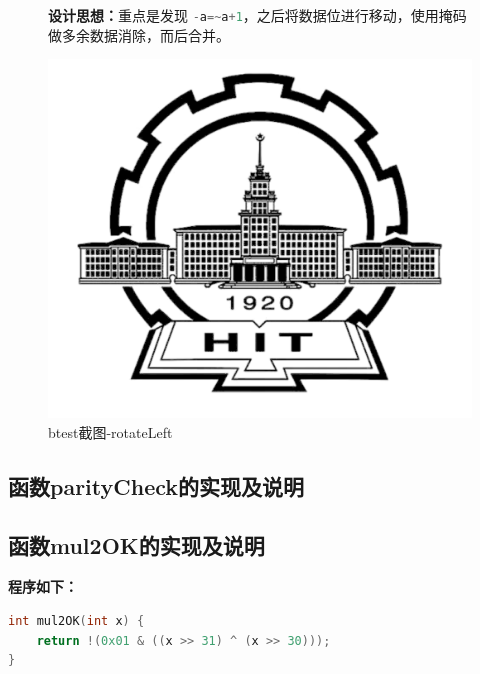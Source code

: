 \begin{figure}[H]
\begin{minipage}[c]{0.5\linewidth}
\textbf{设计思想：}重点是发现 \lstinline[language=c]|-a=~a+1|，之后将数据位进行移动，使用掩码做多余数据消除，而后合并。
\end{minipage}
\begin{minipage}[c]{0.4\linewidth}
\centering
\includegraphics[width=0.9\linewidth]{figures/HIT}
\caption{btest截图-rotateLeft}
\label{fig:rotateLeft}
\end{minipage}
\end{figure}

\subsection{函数parityCheck的实现及说明}
\subsection{函数mul2OK的实现及说明}
\textbf{程序如下：}

\begin{lstlisting}[language = c]
int mul2OK(int x) {
	return !(0x01 & ((x >> 31) ^ (x >> 30)));
}
\end{lstlisting}


